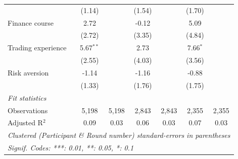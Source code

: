\begin{tabular}{lcccccc}
                                        & (1.14)        &               & (1.54)        &               & (1.70)        &   \\   
   Finance course                       & 2.72          &               & -0.12         &               & 5.09          &   \\   
                                        & (2.72)        &               & (3.35)        &               & (4.84)        &   \\   
   Trading experience                   & 5.67$^{**}$   &               & 2.73          &               & 7.66$^{*}$    &   \\   
                                        & (2.55)        &               & (4.03)        &               & (3.56)        &   \\   
   Risk aversion                        & -1.14         &               & -1.16         &               & -0.88         &   \\   
                                        & (1.33)        &               & (1.76)        &               & (1.75)        &   \\   
   \midrule
   \emph{Fit statistics}\\
   Observations                         & 5,198         & 5,198         & 2,843         & 2,843         & 2,355         & 2,355\\  
   Adjusted R$^2$                       & 0.09          & 0.03          & 0.06          & 0.03          & 0.07          & 0.03\\  
   \midrule \midrule
   \multicolumn{7}{l}{\emph{Clustered (Participant \& Round number) standard-errors in parentheses}}\\
   \multicolumn{7}{l}{\emph{Signif. Codes: ***: 0.01, **: 0.05, *: 0.1}}\\
\end{tabular}
\par\endgroup
